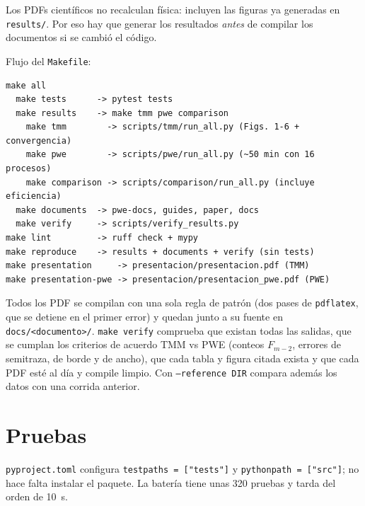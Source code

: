 \documentclass[11pt,a4paper]{article}
\begin{document}
Los PDFs científicos no recalculan física: incluyen las figuras ya generadas
en \texttt{results/}. Por eso hay que generar los resultados \emph{antes} de
compilar los documentos si se cambió el código.

Flujo del \texttt{Makefile}:

\begin{lstlisting}
make all
  make tests      -> pytest tests
  make results    -> make tmm pwe comparison
    make tmm        -> scripts/tmm/run_all.py (Figs. 1-6 + convergencia)
    make pwe        -> scripts/pwe/run_all.py (~50 min con 16 procesos)
    make comparison -> scripts/comparison/run_all.py (incluye eficiencia)
  make documents  -> pwe-docs, guides, paper, docs
  make verify     -> scripts/verify_results.py
make lint         -> ruff check + mypy
make reproduce    -> results + documents + verify (sin tests)
make presentation     -> presentacion/presentacion.pdf (TMM)
make presentation-pwe -> presentacion/presentacion_pwe.pdf (PWE)
\end{lstlisting}

Todos los PDF se compilan con una sola regla de patrón (dos pases de
\texttt{pdflatex}, que se detiene en el primer error) y quedan junto a su fuente en \texttt{docs/<documento>/}.
\texttt{make verify} comprueba que existan todas las salidas, que se cumplan
los criterios de acuerdo TMM vs PWE (conteos \(F_{m-2}\), errores de
semitraza, de borde y de ancho), que cada tabla y figura citada exista y que
cada PDF esté al día y compile limpio. Con \texttt{--reference DIR} compara
además los datos con una corrida anterior.

\section{Pruebas}

\texttt{pyproject.toml} configura \texttt{testpaths = ["tests"]} y
\texttt{pythonpath = ["src"]}; no hace falta instalar el paquete. La batería
tiene unas 320 pruebas y tarda del orden de 10~s.
\end{document}
